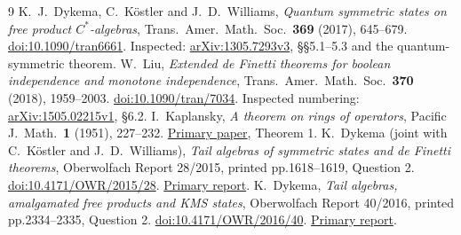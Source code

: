 \documentclass[11pt]{article}
\begin{document}
\begingroup
\small
\begin{thebibliography}{9}
K.~J.~Dykema, C.~K\"ostler and J.~D.~Williams,
\emph{Quantum symmetric states on free product \(C^*\)-algebras},
Trans.\ Amer.\ Math.\ Soc.\ \textbf{369} (2017), 645--679.
\href{https://doi.org/10.1090/tran6661}{doi:10.1090/tran6661}.
Inspected: \href{https://arxiv.org/pdf/1305.7293v3}{arXiv:1305.7293v3},
\S\S5.1--5.3 and the quantum-symmetric theorem.
W.~Liu, \emph{Extended de Finetti theorems for boolean independence and
monotone independence}, Trans.\ Amer.\ Math.\ Soc.\ \textbf{370}
(2018), 1959--2003.
\href{https://doi.org/10.1090/tran/7034}{doi:10.1090/tran/7034}.
Inspected numbering:
\href{https://arxiv.org/pdf/1505.02215v1}{arXiv:1505.02215v1}, \S6.2.
I.~Kaplansky, \emph{A theorem on rings of operators},
Pacific J.\ Math.\ \textbf{1} (1951), 227--232.
\href{https://msp.org/pjm/1951/1-2/pjm-v1-n2-p06-s.pdf}{Primary paper},
Theorem 1.
K.~Dykema (joint with C.~K\"ostler and J.~D.~Williams),
\emph{Tail algebras of symmetric states and de Finetti theorems},
Oberwolfach Report 28/2015, printed pp.1618--1619, Question 2.
\href{https://doi.org/10.4171/OWR/2015/28}{doi:10.4171/OWR/2015/28}.
\href{https://ems.press/content/serial-article-files/46575}{Primary report}.
K.~Dykema, \emph{Tail algebras, amalgamated free products and KMS states},
Oberwolfach Report 40/2016, printed pp.2334--2335, Question 2.
\href{https://doi.org/10.4171/OWR/2016/40}{doi:10.4171/OWR/2016/40}.
\href{https://ems.press/content/serial-article-files/46645}{Primary report}.
\end{thebibliography}
\endgroup
\end{document}

